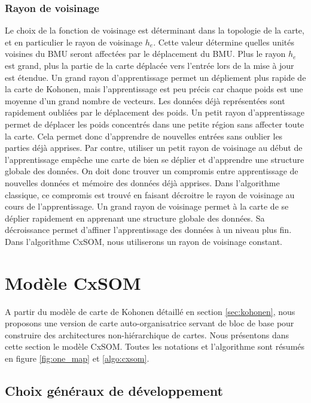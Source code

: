 \subsubsection{Rayon de voisinage}
Le choix de la fonction de voisinage est déterminant dans la topologie de la carte, et en particulier le rayon de voisinage $h_e$.
Cette valeur détermine quelles unités voisines du BMU seront affectées par le déplacement du BMU.
Plus le rayon $h_e$ est grand, plus la partie de la carte déplacée vers l'entrée lors de la mise à jour est étendue. Un grand rayon d'apprentissage permet un dépliement plus rapide de la carte de Kohonen, mais l'apprentissage est peu précis car chaque poids est une moyenne d'un grand nombre de vecteurs. Les données déjà représentées sont rapidement oubliées par le déplacement des poids.
Un petit rayon d'apprentissage permet de déplacer les poids concentrés dans une petite région sans affecter toute la carte. Cela permet donc d'apprendre de nouvelles entrées sans oublier les parties déjà apprises. Par contre, utiliser un petit rayon de voisinage au début de l'apprentissage empêche une carte de bien se déplier et d'apprendre une structure globale des données. On doit donc trouver un compromis entre apprentissage de nouvelles données et mémoire des données déjà apprises.
Dans l'algorithme classique, ce compromis est trouvé en faisant décroitre le rayon de voisinage au cours de l'apprentissage. Un grand rayon de voisinage permet à la carte de se déplier rapidement en apprenant une structure globale des données. Sa décroissance permet d'affiner l'apprentissage des données à un niveau plus fin. 
Dans l'algorithme CxSOM, nous utiliserons un rayon de voisinage constant.
\section{Modèle CxSOM}
A partir du modèle de carte de Kohonen détaillé en section \ref{sec:kohonen}, nous proposons une version de carte auto-organisatrice servant de bloc de base pour construire des architectures non-hiérarchique de cartes. Nous présentons dans cette section le modèle CxSOM. Toutes les notations et l'algorithme sont résumés en figure \ref{fig:one_map} et \ref{algo:cxsom}.

\subsection{Choix généraux de développement}


